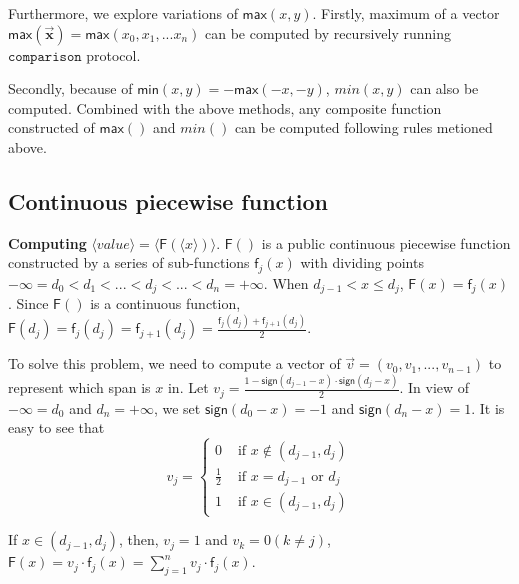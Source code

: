 \documentclass[letterpaper]{article} %
\begin{document}
    Furthermore, we explore variations of $\mathsf{max}(x,y)$.
    Firstly, maximum of a vector $\mathsf{max}(\overrightarrow{\mathbf{x}})=\mathsf{max}(x_{0},x_{1},...x_{n})$
    can be computed by recursively running $\mathtt{comparison}$ protocol.

    Secondly, because of $\mathsf{min}(x,y)=-\mathsf{max}(-x,-y)$,  $min(x,y)$ can also be computed.
    Combined with the above methods,
    any composite function constructed of $\mathsf{max}()$ and $min()$ can be computed following rules metioned above.


    \subsection{Continuous piecewise function}
    \textbf{Computing} $\langle value\rangle  = \langle \mathsf{F}(\langle x\rangle)\rangle $.
    $\mathsf{F}()$ is a public continuous piecewise function constructed by a series of sub-functions $\mathsf{f}_{j}(x)$
    with dividing points $-\infty =d_{0}<d_{1}<...<d_{j}<...<d_{n}=+\infty$.
    When $d_{j-1}< x\leq d_{j}$, $\mathsf{F}(x) =\mathsf{f}_{j}(x)$.
    Since $\mathsf{F}()$ is a continuous function, $\mathsf{F}(d_{j}) =\mathsf{f}_{j}(d_{j})=\mathsf{f}_{j+1}(d_{j})=\frac{\mathsf{f}_{j}(d_{j})+\mathsf{f}_{j+1}(d_{j})}{2}$.


    To solve this problem, we need to compute a vector of
    $\overrightarrow{v}=(v_{0},v_{1},...,v_{n-1})$ to represent which span is $x$ in.
    Let $v_{j} = \frac{1-\mathsf{sign}(d_{j-1}-x)\cdot \mathsf{sign}(d_{j}-x)}{2}$.
    In view of $-\infty =d_{0}$ and $d_{n}=+\infty$,
    we set $\mathsf{sign}(d_{0}-x)=-1$ and $\mathsf{sign}(d_{n}-x)=1$.
    It is easy to see that
    $$v_{j}=\begin{cases}
        0 & \text{ if } x\notin (d_{j-1},d_{j}) \\
        \frac{1}{2} & \text{ if } x = d_{j-1} \text{ or } d_{j}\\
        1 & \text{ if } x\in (d_{j-1},d_{j})
        \end{cases}$$

    If $x\in (d_{j-1},d_{j})$, then, $v_{j}=1$ and $v_{k}=0 (k\neq j)$, $\mathsf{F}(x)=v_{j}\cdot \mathsf{f}_{j}(x)=\sum_{j=1}^{n}v_{j}\cdot \mathsf{f}_{j}(x)$.
\end{document}
